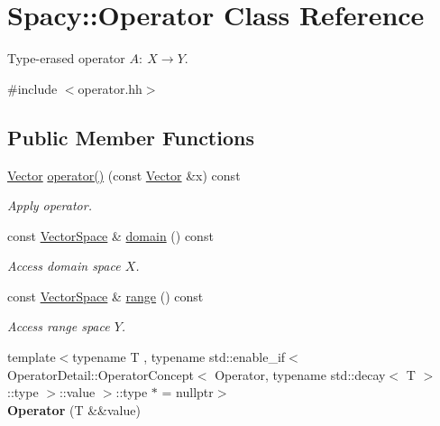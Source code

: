 \hypertarget{classSpacy_1_1Operator}{\section{\-Spacy\-:\-:\-Operator \-Class \-Reference}
\label{classSpacy_1_1Operator}
}


\-Type-\/erased operator $A:\ X \to Y $.  




{\ttfamily \#include $<$operator.\-hh$>$}

\subsection*{\-Public \-Member \-Functions}
\begin{DoxyCompactItemize}
\item 
\hypertarget{classSpacy_1_1Operator_a2ab6072d6f9d98e0d5590531c080e3ad}{\hyperlink{classSpacy_1_1Vector}{\-Vector} \hyperlink{classSpacy_1_1Operator_a2ab6072d6f9d98e0d5590531c080e3ad}{operator()} (const \hyperlink{classSpacy_1_1Vector}{\-Vector} \&x) const }\label{classSpacy_1_1Operator_a2ab6072d6f9d98e0d5590531c080e3ad}

\begin{DoxyCompactList}\small\item\em \-Apply operator. \end{DoxyCompactList}\item 
\hypertarget{classSpacy_1_1Operator_a3b3d457bee48adf00d683a6aec4aa841}{const \hyperlink{classSpacy_1_1VectorSpace}{\-Vector\-Space} \& \hyperlink{classSpacy_1_1Operator_a3b3d457bee48adf00d683a6aec4aa841}{domain} () const }\label{classSpacy_1_1Operator_a3b3d457bee48adf00d683a6aec4aa841}

\begin{DoxyCompactList}\small\item\em \-Access domain space $X$. \end{DoxyCompactList}\item 
\hypertarget{classSpacy_1_1Operator_a8cf3b1e3b6c5c6ab5ddc09224ed8ab24}{const \hyperlink{classSpacy_1_1VectorSpace}{\-Vector\-Space} \& \hyperlink{classSpacy_1_1Operator_a8cf3b1e3b6c5c6ab5ddc09224ed8ab24}{range} () const }\label{classSpacy_1_1Operator_a8cf3b1e3b6c5c6ab5ddc09224ed8ab24}

\begin{DoxyCompactList}\small\item\em \-Access range space $Y$. \end{DoxyCompactList}\item 
\hypertarget{classSpacy_1_1Operator_adfd4cdca1e6d705e9a52a6d3930c83d2}{{\footnotesize template$<$typename T , typename std\-::enable\-\_\-if$<$ Operator\-Detail\-::\-Operator\-Concept$<$ Operator, typename std\-::decay$<$ T $>$\-::type $>$\-::value $>$\-::type $\ast$  = nullptr$>$ }\\{\bfseries \-Operator} (\-T \&\&value)}\label{classSpacy_1_1Operator_adfd4cdca1e6d705e9a52a6d3930c83d2}


\end{DoxyCompactItemize}
